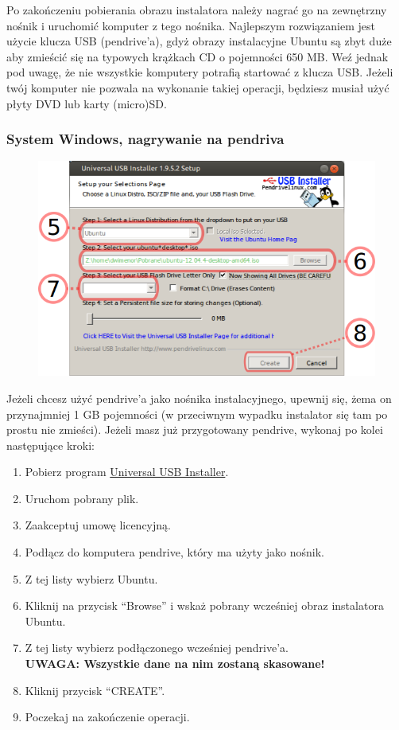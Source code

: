 Po zakończeniu pobierania obrazu instalatora należy nagrać go na zewnętrzny nośnik i uruchomić komputer z tego nośnika. Najlepszym rozwiązaniem jest użycie klucza USB (pendrive'a), gdyż obrazy instalacyjne Ubuntu są zbyt duże aby zmieścić się na typowych krążkach CD o pojemności 650 MB. Weź jednak pod uwagę, że nie wszystkie komputery potrafią startować z klucza USB. Jeżeli twój komputer nie pozwala na wykonanie takiej operacji, będziesz musiał użyć płyty DVD lub karty (micro)SD.

\subsubsection{System Windows, nagrywanie na pendriva}
\begin{figure}
		\includegraphics[width=\linewidth]{images/instalacja_nagrywanie_obrazu.png}
\end{figure}
\noindent Jeżeli chcesz użyć pendrive'a jako nośnika instalacyjnego, upewnij się, żema on przynajmniej 1 GB pojemności (w przeciwnym wypadku instalator się tam po prostu nie zmieści). Jeżeli masz już przygotowany pendrive, wykonaj po kolei następujące kroki:
\begin{enumerate}
\item Pobierz program \href{http://www.pendrivelinux.com/downloads/Universal-USB-Installer/Universal-USB-Installer-1.9.5.2.exe}{Universal USB Installer}.
\item Uruchom pobrany plik.
\item Zaakceptuj umowę licencyjną.
\item Podłącz do komputera pendrive, który ma użyty jako nośnik.
\item Z tej listy wybierz Ubuntu.
\item Kliknij na przycisk “Browse” i wskaż pobrany wcześniej obraz instalatora Ubuntu.
\item Z tej listy wybierz podłączonego wcześniej pendrive'a.\\
\textbf{UWAGA: Wszystkie dane na nim zostaną skasowane!}
\item Kliknij przycisk “CREATE”.
\item Poczekaj na zakończenie operacji.
\end{enumerate}
\clearpage

